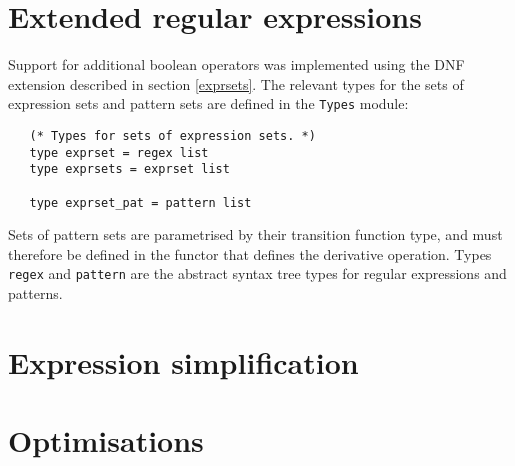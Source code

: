 \section{Extended regular expressions}

Support for additional boolean operators was implemented using the DNF extension
described in section \ref{exprsets}. The relevant types for the sets of
expression sets and pattern sets are defined in the \texttt{Types} module:

\begin{lstlisting}
   (* Types for sets of expression sets. *)
   type exprset = regex list
   type exprsets = exprset list

   type exprset_pat = pattern list
\end{lstlisting}

Sets of pattern sets are parametrised by their transition function type, and
must therefore be defined in the functor that defines the derivative operation.
Types \texttt{regex} and \texttt{pattern} are the abstract syntax tree types for
regular expressions and patterns.


\section{Expression simplification}


\section{Optimisations}
\label{opts}


